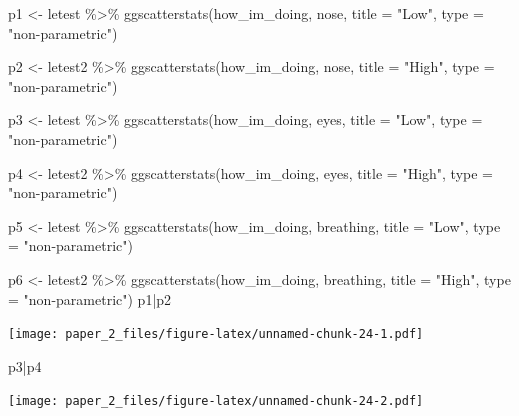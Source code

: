 \documentclass[
]{article}
\newenvironment{Shaded}{\begin{snugshade}}{\end{snugshade}}
\newcommand{\AttributeTok}[1]{\textcolor[rgb]{0.77,0.63,0.00}{#1}}
\newcommand{\FunctionTok}[1]{\textcolor[rgb]{0.00,0.00,0.00}{#1}}
\newcommand{\NormalTok}[1]{#1}
\newcommand{\OtherTok}[1]{\textcolor[rgb]{0.56,0.35,0.01}{#1}}
\newcommand{\SpecialCharTok}[1]{\textcolor[rgb]{0.00,0.00,0.00}{#1}}
\newcommand{\StringTok}[1]{\textcolor[rgb]{0.31,0.60,0.02}{#1}}
\begin{document}
\begin{Shaded}
\begin{Highlighting}[]
\NormalTok{p1 }\OtherTok{\textless{}{-}}\NormalTok{ letest }\SpecialCharTok{\%\textgreater{}\%}
  \FunctionTok{ggscatterstats}\NormalTok{(how\_im\_doing, nose, }\AttributeTok{title =} \StringTok{"Low"}\NormalTok{, }\AttributeTok{type =} \StringTok{"non{-}parametric"}\NormalTok{)}


\NormalTok{p2 }\OtherTok{\textless{}{-}}\NormalTok{ letest2 }\SpecialCharTok{\%\textgreater{}\%}
  \FunctionTok{ggscatterstats}\NormalTok{(how\_im\_doing, nose, }\AttributeTok{title =} \StringTok{"High"}\NormalTok{, }\AttributeTok{type =} \StringTok{"non{-}parametric"}\NormalTok{)}

\NormalTok{p3 }\OtherTok{\textless{}{-}}\NormalTok{ letest }\SpecialCharTok{\%\textgreater{}\%}
  \FunctionTok{ggscatterstats}\NormalTok{(how\_im\_doing, eyes, }\AttributeTok{title =} \StringTok{"Low"}\NormalTok{, }\AttributeTok{type =} \StringTok{"non{-}parametric"}\NormalTok{)}


\NormalTok{p4 }\OtherTok{\textless{}{-}}\NormalTok{ letest2 }\SpecialCharTok{\%\textgreater{}\%}
  \FunctionTok{ggscatterstats}\NormalTok{(how\_im\_doing, eyes, }\AttributeTok{title =} \StringTok{"High"}\NormalTok{, }\AttributeTok{type =} \StringTok{"non{-}parametric"}\NormalTok{)}

\NormalTok{p5 }\OtherTok{\textless{}{-}}\NormalTok{ letest }\SpecialCharTok{\%\textgreater{}\%}
  \FunctionTok{ggscatterstats}\NormalTok{(how\_im\_doing, breathing, }\AttributeTok{title =} \StringTok{"Low"}\NormalTok{, }\AttributeTok{type =} \StringTok{"non{-}parametric"}\NormalTok{)}


\NormalTok{p6 }\OtherTok{\textless{}{-}}\NormalTok{ letest2 }\SpecialCharTok{\%\textgreater{}\%}
  \FunctionTok{ggscatterstats}\NormalTok{(how\_im\_doing, breathing, }\AttributeTok{title =} \StringTok{"High"}\NormalTok{, }\AttributeTok{type =} \StringTok{"non{-}parametric"}\NormalTok{)}
\NormalTok{p1}\SpecialCharTok{|}\NormalTok{p2}
\end{Highlighting}
\end{Shaded}

\texttt{[image: paper\_2\_files/figure-latex/unnamed-chunk-24-1.pdf]}

\begin{Shaded}
\begin{Highlighting}[]
\NormalTok{p3}\SpecialCharTok{|}\NormalTok{p4}
\end{Highlighting}
\end{Shaded}

\texttt{[image: paper\_2\_files/figure-latex/unnamed-chunk-24-2.pdf]}
\end{document}
